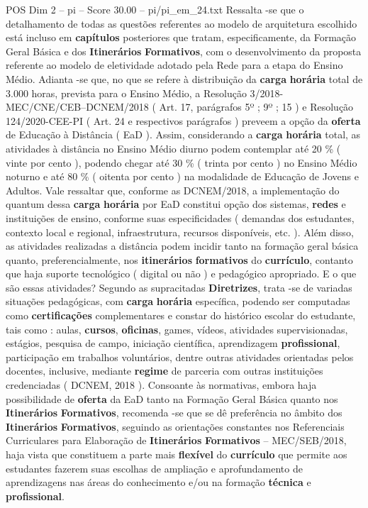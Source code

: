 \begin{textsample}{POS Dim 2 – pi – Score 30.00 – pi/pi\_em\_24.txt}
Ressalta -se que o detalhamento de todas as questões referentes ao modelo de arquitetura escolhido está incluso em \textbf{capítulos} posteriores que tratam, especificamente, da Formação Geral Básica e dos \textbf{Itinerários} \textbf{Formativos}, com o desenvolvimento da proposta referente ao modelo de eletividade adotado pela Rede para a etapa do Ensino Médio.
Adianta -se que, no que se refere à distribuição da \textbf{carga} \textbf{horária} total de 3.000 horas, prevista para o Ensino Médio, a Resolução 3/2018-MEC/CNE/CEB–DCNEM/2018 ( Art. 17, parágrafos 5º ; 9º ; 15 ) e Resolução 124/2020-CEE-PI ( Art. 24 e respectivos parágrafos ) preveem a opção da \textbf{oferta} de Educação à Distância ( EaD ).
Assim, considerando a \textbf{carga} \textbf{horária} total, as atividades à distância no Ensino Médio diurno podem contemplar até 20 \% ( vinte por cento ), podendo chegar até 30 \% ( trinta por cento ) no Ensino Médio noturno e até 80 \% ( oitenta por cento ) na modalidade de Educação de Jovens e Adultos.
Vale ressaltar que, conforme as DCNEM/2018, a implementação do quantum dessa \textbf{carga} \textbf{horária} por EaD constitui opção dos sistemas, \textbf{redes} e instituições de ensino, conforme suas especificidades ( demandas dos estudantes, contexto local e regional, infraestrutura, recursos disponíveis, etc. ).
Além disso, as atividades realizadas a distância podem incidir tanto na formação geral básica quanto, preferencialmente, nos \textbf{itinerários} \textbf{formativos} do \textbf{currículo}, contanto que haja suporte tecnológico ( digital ou não ) e pedagógico apropriado.
E o que são essas atividades?
Segundo as supracitadas \textbf{Diretrizes}, trata -se de variadas situações pedagógicas, com \textbf{carga} \textbf{horária} específica, podendo ser computadas como \textbf{certificações} complementares e constar do histórico escolar do estudante, tais como : aulas, \textbf{cursos}, \textbf{oficinas}, games, vídeos, atividades supervisionadas, estágios, pesquisa de campo, iniciação científica, aprendizagem \textbf{profissional}, participação em trabalhos voluntários, dentre outras atividades orientadas pelos docentes, inclusive, mediante \textbf{regime} de parceria com outras instituições credenciadas ( DCNEM, 2018 ).
Consoante às normativas, embora haja possibilidade de \textbf{oferta} da EaD tanto na Formação Geral Básica quanto nos \textbf{Itinerários} \textbf{Formativos}, recomenda -se que se dê preferência no âmbito dos \textbf{Itinerários} \textbf{Formativos}, seguindo as orientações constantes nos Referenciais Curriculares para Elaboração de \textbf{Itinerários} \textbf{Formativos} – MEC/SEB/2018, haja vista que constituem a parte mais \textbf{flexível} do \textbf{currículo} que permite aos estudantes fazerem suas escolhas de ampliação e aprofundamento de aprendizagens nas áreas do conhecimento e/ou na formação \textbf{técnica} e \textbf{profissional}.

\end{textsample}
